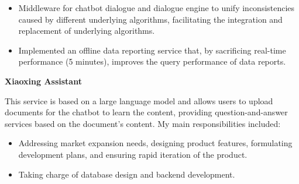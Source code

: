 \documentclass[a4paper]{article}
\newenvironment{changemargin}[2]{%
  \begin{list}{}{%
    \setlength{\topsep}{0pt}%
    \setlength{\leftmargin}{#1}%
    \setlength{\rightmargin}{#2}%
    \setlength{\listparindent}{\parindent}%
    \setlength{\itemindent}{\parindent}%
    \setlength{\parsep}{\parskip}%
  }%
  \item[]}{\end{list}
}
\newenvironment{body} {
	\vspace*{-16pt}
	\begin{changemargin}{-0.5in}{-0.5in}
  }
	{\end{changemargin}
}
\begin{document}
\begin{body}
	\vspace*{-8pt}
	\begin{itemize} \itemsep -0pt  %
		\item \begin{justify}
			Middleware for chatbot dialogue and dialogue engine to unify inconsistencies caused by different underlying algorithms, facilitating the integration and replacement of underlying algorithms.
		\end{justify} 
	\end{itemize}

	\vspace*{-8pt}
	\begin{itemize} \itemsep -0pt  %
		\item \begin{justify}
			Implemented an offline data reporting service that, by sacrificing real-time performance (5 minutes), improves the query performance of data reports.
		\end{justify} 
	\end{itemize}

	\medskip

	\textbf{Xiaoxing Assistant} \\

	\begin{justify} 
		This service is based on a large language model and allows users to upload documents for the chatbot to learn the content, providing question-and-answer services based on the document's content. My main responsibilities included:
	\end{justify}
	\smallskip

	\vspace*{-8pt}
	\begin{itemize} \itemsep -0pt  %
		\item \begin{justify} 
			Addressing market expansion needs, designing product features, formulating development plans, and ensuring rapid iteration of the product.
		\end{justify} 
	\end{itemize}

	\vspace*{-8pt}
	\begin{itemize} \itemsep -0pt  %
		\item \begin{justify} 
			Taking charge of database design and backend development.
		\end{justify} 
	\end{itemize}


\end{body}
\end{document}
